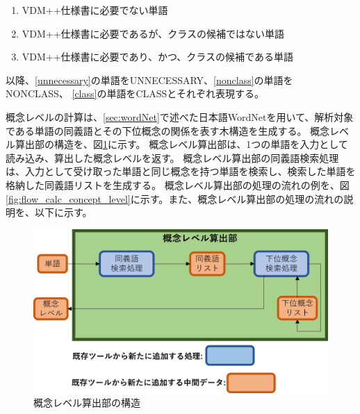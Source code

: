\begin{enumerate}[label=\textbf{\Alph*}.]
    \item VDM++仕様書に必要でない単語
    \label{unnecessary}
    \item VDM++仕様書に必要であるが、クラスの候補ではない単語
    \label{nonclass}
    \item VDM++仕様書に必要であり、かつ、クラスの候補である単語
    \label{class}
\end{enumerate}

以降、\ref{unnecessary}の単語をUNNECESSARY、\ref{nonclass}の単語をNONCLASS、
\ref{class}の単語をCLASSとそれぞれ表現する。

概念レベルの計算は、\ref{sec:wordNet}で述べた日本語WordNetを用いて、解析対象である単語の同義語とその下位概念の関係を表す木構造を生成する。
概念レベル算出部の構造を、図\ref{fig:vgml_concept_level_structure}に示す。
概念レベル算出部は、1つの単語を入力として読み込み、算出した概念レベルを返す。
概念レベル算出部の同義語検索処理は、入力として受け取った単語と同じ概念を持つ単語を検索し、検索した単語を格納した同義語リストを生成する。
概念レベル算出部の処理の流れの例を、図\ref{fig:flow_calc_concept_level}に示す。また、概念レベル算出部の処理の流れの説明を、以下に示す。

\begin{figure}[t]
    \begin{center}
        \includegraphics[width=1.0\columnwidth]{image/vgml_concept_level_structure.png}
        \caption{概念レベル算出部の構造}
        \label{fig:vgml_concept_level_structure}
    \end{center}
\end{figure}

